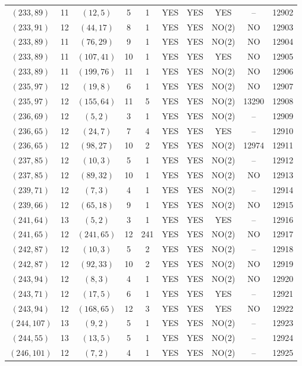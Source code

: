 \begin{longtable}{|c|c|c|c|c|c|c|c|c|c|}
$(233, 89)$ & 11 & $(12, 5)$ & 5 & 1 & YES & YES & YES & -- & 12902\\
$(233, 91)$ & 12 & $(44, 17)$ & 8 & 1 & YES & YES & NO(2) & NO & 12903\\
$(233, 89)$ & 11 & $(76, 29)$ & 9 & 1 & YES & YES & NO(2) & NO & 12904\\
$(233, 89)$ & 11 & $(107, 41)$ & 10 & 1 & YES & YES & YES & NO & 12905\\
$(233, 89)$ & 11 & $(199, 76)$ & 11 & 1 & YES & YES & NO(2) & NO & 12906\\
$(235, 97)$ & 12 & $(19, 8)$ & 6 & 1 & YES & YES & NO(2) & NO & 12907\\
$(235, 97)$ & 12 & $(155, 64)$ & 11 & 5 & YES & YES & NO(2) & 13290 & 12908\\
$(236, 69)$ & 12 & $(5, 2)$ & 3 & 1 & YES & YES & NO(2) & -- & 12909\\
$(236, 65)$ & 12 & $(24, 7)$ & 7 & 4 & YES & YES & YES & -- & 12910\\
$(236, 65)$ & 12 & $(98, 27)$ & 10 & 2 & YES & YES & NO(2) & 12974 & 12911\\
$(237, 85)$ & 12 & $(10, 3)$ & 5 & 1 & YES & YES & NO(2) & -- & 12912\\
$(237, 85)$ & 12 & $(89, 32)$ & 10 & 1 & YES & YES & NO(2) & NO & 12913\\
$(239, 71)$ & 12 & $(7, 3)$ & 4 & 1 & YES & YES & NO(2) & -- & 12914\\
$(239, 66)$ & 12 & $(65, 18)$ & 9 & 1 & YES & YES & NO(2) & NO & 12915\\
$(241, 64)$ & 13 & $(5, 2)$ & 3 & 1 & YES & YES & YES & -- & 12916\\
$(241, 65)$ & 12 & $(241, 65)$ & 12 & 241 & YES & YES & NO(2) & NO & 12917\\
$(242, 87)$ & 12 & $(10, 3)$ & 5 & 2 & YES & YES & NO(2) & -- & 12918\\
$(242, 87)$ & 12 & $(92, 33)$ & 10 & 2 & YES & YES & NO(2) & NO & 12919\\
$(243, 94)$ & 12 & $(8, 3)$ & 4 & 1 & YES & YES & NO(2) & NO & 12920\\
$(243, 71)$ & 12 & $(17, 5)$ & 6 & 1 & YES & YES & YES & -- & 12921\\
$(243, 94)$ & 12 & $(168, 65)$ & 12 & 3 & YES & YES & YES & NO & 12922\\
$(244, 107)$ & 13 & $(9, 2)$ & 5 & 1 & YES & YES & NO(2) & -- & 12923\\
$(244, 55)$ & 13 & $(13, 5)$ & 5 & 1 & YES & YES & NO(2) & -- & 12924\\
$(246, 101)$ & 12 & $(7, 2)$ & 4 & 1 & YES & YES & NO(2) & -- & 12925\\

\end{longtable}

